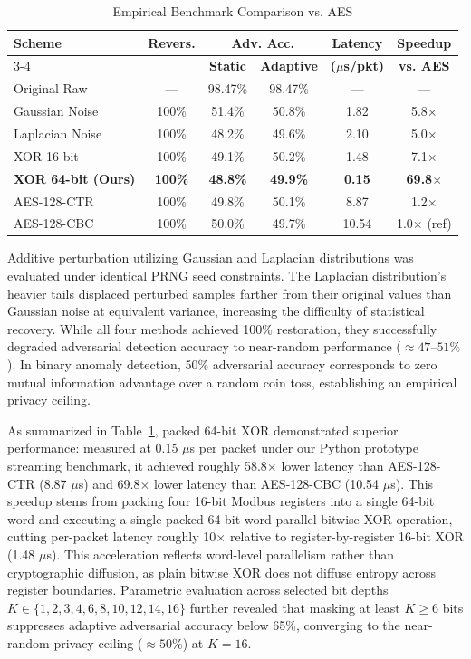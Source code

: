 \documentclass[conference]{IEEEtran}
\begin{document}
\begin{table}[t]
\caption{Empirical Benchmark Comparison vs. AES}
\label{tab:benchmark}
\centering
\scriptsize
\setlength{\tabcolsep}{2.2pt}
\begin{tabular}{lccccc}
\toprule
\textbf{Scheme} & \textbf{Revers.} & \multicolumn{2}{c}{\textbf{Adv. Acc.}} & \textbf{Latency} & \textbf{Speedup} \\
\cmidrule(lr){3-4}
& & \textbf{Static} & \textbf{Adaptive} & \textbf{($\mu$s/pkt)} & \textbf{vs. AES} \\
\midrule
Original Raw & --- & 98.47\% & 98.47\% & --- & --- \\
Gaussian Noise & 100\% & 51.4\% & 50.8\% & 1.82 & 5.8$\times$ \\
Laplacian Noise & 100\% & 48.2\% & 49.6\% & 2.10 & 5.0$\times$ \\
XOR 16-bit & 100\% & 49.1\% & 50.2\% & 1.48 & 7.1$\times$ \\
\textbf{XOR 64-bit (Ours)} & \textbf{100\%} & \textbf{48.8\%} & \textbf{49.9\%} & \textbf{0.15} & \textbf{69.8$\times$} \\
AES-128-CTR & 100\% & 49.8\% & 50.1\% & 8.87 & 1.2$\times$ \\
AES-128-CBC & 100\% & 50.0\% & 49.7\% & 10.54 & 1.0$\times$ (ref) \\
\bottomrule
\end{tabular}
\vspace{-0.2cm}
\end{table}

Additive perturbation utilizing Gaussian and Laplacian distributions was evaluated under identical PRNG seed constraints. The Laplacian distribution's heavier tails displaced perturbed samples farther from their original values than Gaussian noise at equivalent variance, increasing the difficulty of statistical recovery. While all four methods achieved 100\% restoration, they successfully degraded adversarial detection accuracy to near-random performance ($\approx 47$--$51\%$). In binary anomaly detection, 50\% adversarial accuracy corresponds to zero mutual information advantage over a random coin toss, establishing an empirical privacy ceiling.

As summarized in Table~\ref{tab:benchmark}, packed 64-bit XOR demonstrated superior performance: measured at 0.15 $\mu$s per packet under our Python prototype streaming benchmark, it achieved roughly 58.8$\times$ lower latency than AES-128-CTR (8.87 $\mu$s) and 69.8$\times$ lower latency than AES-128-CBC (10.54 $\mu$s). This speedup stems from packing four 16-bit Modbus registers into a single 64-bit word and executing a single packed 64-bit word-parallel bitwise XOR operation, cutting per-packet latency roughly 10$\times$ relative to register-by-register 16-bit XOR (1.48 $\mu$s). This acceleration reflects word-level parallelism rather than cryptographic diffusion, as plain bitwise XOR does not diffuse entropy across register boundaries. Parametric evaluation across selected bit depths $K \in \{1, 2, 3, 4, 6, 8, 10, 12, 14, 16\}$ further revealed that masking at least $K \ge 6$ bits suppresses adaptive adversarial accuracy below 65\%, converging to the near-random privacy ceiling ($\approx 50\%$) at $K=16$.
\end{document}
